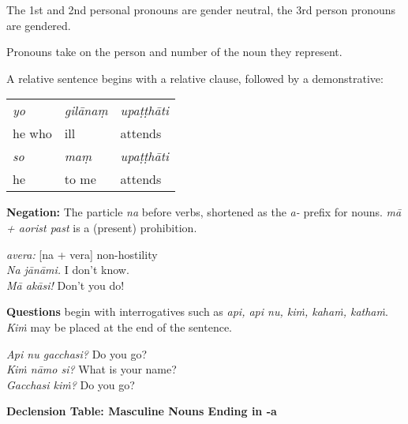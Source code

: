 \documentclass[11pt,oneside]{memoir}
\begin{document}
The 1st and 2nd personal pronouns are gender neutral, the 3rd person pronouns are gendered.

Pronouns take on the person and number of the noun they represent.

\clearpage

A relative sentence begins with a relative clause, followed by a demonstrative:

\begin{center}
\begin{tabular}{lll}
\emph{yo} & \emph{gilānaṃ} & \emph{upaṭṭhāti}\\[0pt]
he who & ill & attends\\[0pt]
\emph{so} & \emph{maṃ} & \emph{upaṭṭhāti}\\[0pt]
he & to me & attends\\[0pt]
\end{tabular}
\end{center}

\bigskip

\begin{multicols}{2}

\textbf{Negation:} The particle \emph{na} before verbs, shortened as the \emph{a-} prefix for
nouns. \emph{mā + aorist past} is a (present) prohibition.

\emph{avera:} [na + vera] non-hostility \\[0pt]
\emph{Na jānāmi.} I don't know. \\[0pt]
\emph{Mā akāsi!} Don't you do!

\columnbreak

\textbf{Questions} begin with interrogatives such as \emph{api, api nu, kiṁ, kahaṁ, kathaṁ}.
\emph{Kiṁ} may be placed at the end of the sentence.

\emph{Api nu gacchasi?} Do you go?\\[0pt]
\emph{Kiṁ nāmo si?} What is your name?\\[0pt]
\emph{Gacchasi kiṁ?} Do you go?

\end{multicols}

\textbf{Declension Table: Masculine Nouns Ending in -a}
\end{document}

